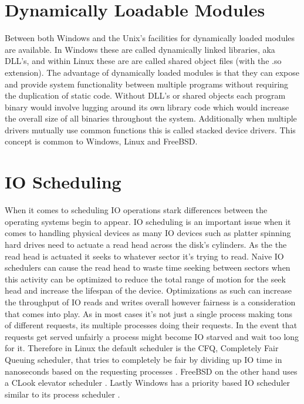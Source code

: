 \documentclass[letterpaper,10pt,draftclsnofoot,onecolumn]{IEEEtran}
\begin{document}
\section{Dynamically Loadable Modules}
Between both Windows and the Unix’s facilities for dynamically loaded modules are available. In Windows these are called dynamically linked libraries, aka DLL’s, and within Linux these are are called shared object files (with the .so extension). The advantage of dynamically loaded modules is that they can expose and provide system functionality between multiple programs without requiring the duplication of static code. Without DLL’s or shared objects each program binary would involve lugging around its own library code which would increase the overall size of all binaries throughout the system. Additionally when multiple drivers mutually use common functions this is called stacked device drivers. This concept is common to Windows, Linux and FreeBSD.\\
\section{IO Scheduling}
When it comes to scheduling IO operations stark differences between the operating systems begin to appear. IO scheduling is an important issue when it comes to handling physical devices as many IO devices such as platter spinning hard drives need to actuate a read head across the disk’s cylinders. As the the read head is actuated it seeks to whatever sector it’s trying to read. Naive IO schedulers can cause the read head to waste time seeking between sectors when this activity can be optimized to reduce the total range of motion for the seek head and increase the lifespan of the device. Optimizations as such can increase the throughput of IO reads and writes overall however fairness is a consideration that comes into play. As in most cases it’s not just a single process making tons of different requests, its multiple processes doing their requests. In the event that requests get served unfairly a process might become IO starved and wait too long for it. Therefore in Linux the default scheduler is the CFQ, Completely Fair Queuing scheduler, that tries to completely be fair by dividing up IO time in nanoseconds based on the requesting processes \cite{love}. FreeBSD on the other hand uses a CLook elevator scheduler \cite{mccusick}. Lastly Windows has a priority based IO scheduler similar to its process scheduler \cite{russinovich}.\\
\end{document}
